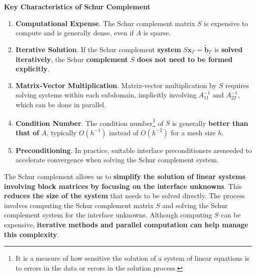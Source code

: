 \highspace
\begin{flushleft}
    \textcolor{Green3}{ \textbf{Key Characteristics of Schur Complement}}
\end{flushleft}
\begin{enumerate}
    \item[\textcolor{Red2}{\faIcon{times}}] \textcolor{Red2}{\textbf{Computational Expense}}. The Schur complement matrix $S$ is expensive to compute and is generally dense, even if $A$ is sparse.

    \item[\textcolor{Green3}{\faIcon{check}}] \textcolor{Green3}{\textbf{Iterative Solution}}. If the Schur complement \textbf{system} $S \mathbf{x}_{\Gamma} = \widetilde{\mathbf{b}}_{\Gamma}$ is \textbf{solved iteratively}, the Schur \textbf{complement} $S$ \textbf{does not need to be formed explicitly}.

    \item[\textcolor{Green3}{\faIcon{check}}] \textcolor{Green3}{\textbf{Matrix-Vector Multiplication}}. Matrix-vector multiplication by $S$ requires solving systems within each subdomain, implicitly involving $A_{11}^{-1}$ and $A_{22}^{-1}$, which can be done in parallel.

    \item \textcolor{Green3}{\textbf{Condition Number}}. The condition number\footnote{It is a measure of how sensitive the solution of a system of linear equations is to errors in the data or errors in the solution process.} of $S$ is generally \textbf{better than that of} $A$, typically $O\left(h^{-1}\right)$ instead of $O\left(h^{-2}\right)$ for a mesh size $h$.

    \item \textcolor{Green3}{\textbf{Preconditioning}}. In practice, suitable interface preconditioners are\break needed to accelerate convergence when solving the Schur complement system.
\end{enumerate}
The Schur complement allows us to \textbf{simplify the solution of linear systems involving block matrices by focusing on the interface unknowns}. This \textcolor{Green3}{\textbf{reduces the size of the system}} that needs to be solved directly. The process involves computing the Schur complement matrix $S$ and solving the Schur complement system for the interface unknowns. Although computing $S$ can be expensive, \textbf{iterative methods and parallel computation can help manage this complexity}.